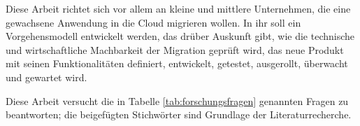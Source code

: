 Diese Arbeit richtet sich vor allem an kleine und mittlere Unternehmen, die 
eine gewachsene Anwendung in die Cloud migrieren wollen. In ihr soll ein 
Vorgehensmodell entwickelt werden, das drüber Auskunft gibt, wie die technische 
und wirtschaftliche Machbarkeit der Migration geprüft wird, das neue Produkt 
mit seinen Funktionalitäten definiert, entwickelt, getestet, ausgerollt, 
überwacht und gewartet wird.

Diese Arbeit versucht die in Tabelle \ref{tab:forschungsfragen} genannten 
Fragen zu beantworten; die beigefügten Stichwörter sind Grundlage der 
Literaturrecherche.



\begin{comment}
Reply, das Unternehmen mit dem in Kooperation diese 
Bachelor-Thesis 
entstanden ist, ist ein an der italienischen Börse gehandeltes 
IT-Beratungsunternehmen und betrachtet sich 
als "`Living network"'\ aus hochspezialisierten Tochterunternehmen. Seit der 
Gründung 1996 konnte Reply seinen Umsatz auf über 705 Millionen Euro bei 5.245 
Angestellten im Jahr 2015 steigern. Das Netzwerk wuchs und wächst rasch: 
2016 wurden bis November drei neue Firmen aquiriert. Zwei 
Tochtergesellschaften, die schon seit mehreren Jahren Teil von Reply sind, 
möchte ich genauer vorstellen, da ihre Unternehmensprofile das 
Migrationsprojekt in dessen Rahmen diese Thesis entstanden ist, in besonderem 
Maße beeinflussen. \\
Die vormalige syskoplan AG, seit dem Erwerb 2010 \pcite{}{12}{replycompprofile} 
Syskoplan Reply, ist ein Spezialist für SAP-Applikationen und 
-Plattformen \pcite{}{10}{replycompprofile} und entwickelt seit 1999 das 
integrierte Facility Management System (iFMS). iFMS verbindet die in SAP 
hinterlegten Daten mit Gebäudeplänen und versucht Prozesse rund um die 
Verwaltung von Immobilien zu unterstützen. Die gewachsene 
Java-Anwendung mit einer Client-Server-Architektur lässt sich inzwischen nur 
noch schwer um von Kunden gewünschte Funktionen erweitern. Auch die Bedienung 
über 
eine zusätzlich zu installierenden Anwendung wirkt in Zeiten, in denen Nutzer 
es gewohnt sind, auch umfangreiche Software über den Webbrowser zu bedienen, 
anachronstisch. Beide Aspekte schränken die zukünftige
Wettbewerbsfähigkeit der Software ein. \\
Die ehemalige Arlanis Software AG wurde 2012 von Reply übernommen und ist 
Spezialist für Lösungen auf Basis des Cloud Anbieters Salesforce. 


\end{comment}
